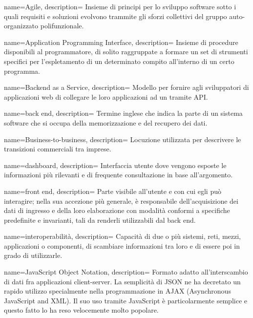  {
name=Agile,
description={
Insieme di principi per lo sviluppo software sotto i quali requisiti e
soluzioni evolvono trammite gli sforzi collettivi del gruppo auto-organizzato
polifunzionale.
}
}

 {
name=Application Programming Interface,
description={
Insieme di procedure disponibili al programmatore, di solito raggruppate a
formare un set di strumenti specifici per l’espletamento di un determinato
compito all’interno di un certo programma.
}
}

 {
name=Backend as a Service,
description={
Modello per fornire agli sviluppatori di applicazioni web di collegare le loro
applicazioni ad un  tramite API.
}
}

 {
name=back end,
description={
Termine inglese che indica la parte di un sistema software che si occupa della
memorizzazione e del recupero dei dati.
}
}

 {
name=Business-to-business,
description={
Locuzione utilizzata per descrivere le transizioni commerciali tra imprese.
}
}

 {
name=dashboard,
description={
Interfaccia utente dove vengono esposte le informazioni più rilevanti e di
frequente consultazione in base all'argomento.
}
}

 {
name=front end,
description={
Parte visibile all’utente e con cui egli può interagire; nella sua accezione più
generale, è responsabile dell’acquisizione dei dati di ingresso e della loro
elaborazione con modalità conformi a specifiche predefinite e invarianti, tali
da renderli utilizzabili dal back end.
}
}

 {
name=interoperabilità,
description={
Capacità di due o più sistemi, reti, mezzi, applicazioni o componenti, di
scambiare informazioni tra loro e di essere poi in grado di utilizzarle.
}
}

 {
name=JavaScript Object Notation,
description={
Formato adatto all’interscambio di dati fra applicazioni client-server. La
semplicità di JSON ne ha decretato un rapido utilizzo specialmente nella
programmazione in AJAX (Asynchronous JavaScript and XML). Il suo uso tramite
JavaScript è particolarmente semplice e questo fatto lo ha reso velocemente
molto popolare.
}
}

